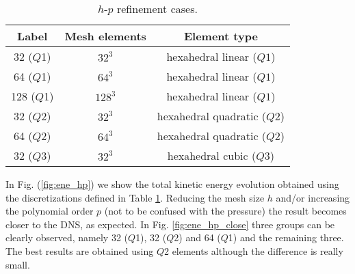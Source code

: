 \begin{table}[h]
\centering
\begin{tabular}{ccc}
\hline
Label&Mesh elements&Element type\\
\hline
32 ($Q$1)&$32^3$&hexahedral linear ($Q1$)\\
64 ($Q$1)&$64^3$&hexahedral linear ($Q1$)\\
128 ($Q$1)&$128^3$&hexahedral linear ($Q1$)\\
32 ($Q$2)&$32^3$&hexahedral quadratic ($Q2$)\\
64 ($Q$2)&$64^3$&hexahedral quadratic ($Q2$)\\
32 ($Q$3)&$32^3$&hexahedral cubic ($Q3$)\\
\hline
\end{tabular}
\caption{$h$-$p$ refinement cases.}
\label{table:refinement}
\end{table}


In Fig. (\ref{fig:ene_hp}) we show the total kinetic energy evolution obtained using the discretizations defined in Table \ref{table:refinement}. Reducing the mesh size $h$ and/or increasing the polynomial order $p$ (not to be confused with the pressure) the result becomes closer to the DNS, as expected. In Fig. \ref{fig:ene_hp_close} three groups can be clearly observed, namely 32 ($Q$1), 32 ($Q$2) and 64 ($Q$1) and the remaining three. The best results are obtained using $Q$2 elements although the difference is really small.


